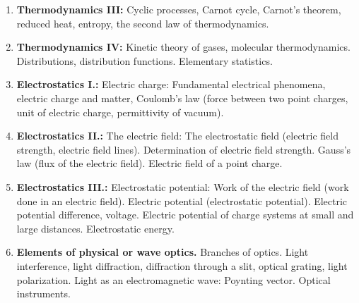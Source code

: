 \documentclass[t,aspectratio=169]{beamer}
\begin{document}
\begin{frame}
\begin{enumerate}
\pagebreak
{} pt
\item \textbf{Thermodynamics III:} Cyclic processes, Carnot cycle, Carnot’s theorem, reduced heat, entropy, the second law of thermodynamics.
\item \textbf{Thermodynamics IV:} Kinetic theory of gases, molecular thermodynamics. Distributions, distribution functions. Elementary statistics.
\item \textbf{Electrostatics I.:} Electric charge: Fundamental electrical phenomena, electric charge and matter, Coulomb’s law (force between two point charges, unit of electric charge, permittivity of vacuum).
\item \textbf{Electrostatics II.:} The electric field: The electrostatic field (electric field strength, electric field lines). Determination of electric field strength. Gauss’s law (flux of the electric field). Electric field of a point charge.
\pagebreak
\item \textbf{Electrostatics III.:} Electrostatic potential: Work of the electric field (work done in an electric field). Electric potential (electrostatic potential). Electric potential difference, voltage. Electric potential of charge systems at small and large distances. Electrostatic energy.
\item \textbf{Elements of physical or wave optics.} Branches of optics. Light interference, light diffraction, diffraction through a slit, optical grating, light polarization. Light as an electromagnetic wave: Poynting vector. Optical instruments.
\end{enumerate}
\end{frame}

\end{document}
